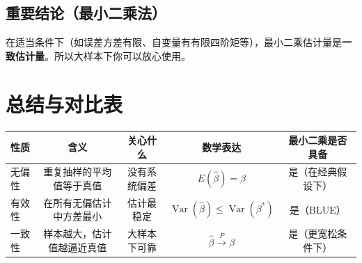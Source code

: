 \documentclass[a4paper,12pt]{article}
\begin{document}
\subsection*{重要结论（最小二乘法）}
在适当条件下（如误差方差有限、自变量有有限四阶矩等），最小二乘估计量是\textbf{一致估计量}。所以大样本下你可以放心使用。

\section{总结与对比表}

\begin{table}[h]
\centering
\begin{tabular}{@{}lcccc@{}}
\toprule
性质   & 含义                     & 关心什么       & 数学表达                                    & 最小二乘是否具备   \\
\midrule
无偏性 & 重复抽样的平均值等于真值     & 没有系统偏差   & \(E(\hat{\beta})=\beta\)                  & 是（在经典假设下） \\
有效性 & 在所有无偏估计中方差最小     & 估计最稳定     & \(\operatorname{Var}(\hat{\beta}) \le \operatorname{Var}(\beta^*)\) & 是（BLUE）       \\
一致性 & 样本越大，估计值越逼近真值   & 大样本下可靠   & \(\hat{\beta} \xrightarrow{P} \beta\)     & 是（更宽松条件下） \\
\bottomrule
\end{tabular}
\end{table}
\end{document}
